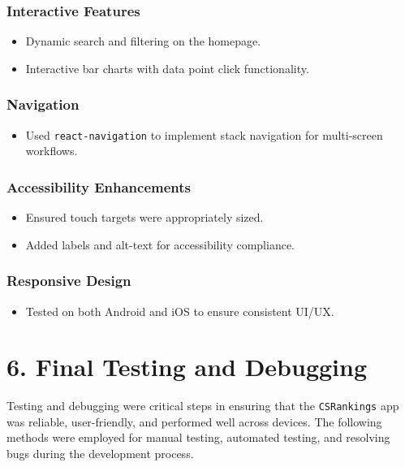 \documentclass[12pt]{article}
\begin{document}
\subsubsection*{Interactive Features}
\begin{itemize}
    \item Dynamic search and filtering on the homepage.
    \item Interactive bar charts with data point click functionality.
\end{itemize}

\subsubsection*{Navigation}
\begin{itemize}
    \item Used \texttt{react-navigation} to implement stack navigation for multi-screen workflows.
\end{itemize}

\subsubsection*{Accessibility Enhancements}
\begin{itemize}
    \item Ensured touch targets were appropriately sized.
    \item Added labels and alt-text for accessibility compliance.
\end{itemize}

\subsubsection*{Responsive Design}
\begin{itemize}
    \item Tested on both Android and iOS to ensure consistent UI/UX.
\end{itemize}

\bigskip
\section*{6. Final Testing and Debugging}

Testing and debugging were critical steps in ensuring that the \texttt{CSRankings} app was reliable, user-friendly, and performed well across devices. The following methods were employed for manual testing, automated testing, and resolving bugs during the development process.
\end{document}
